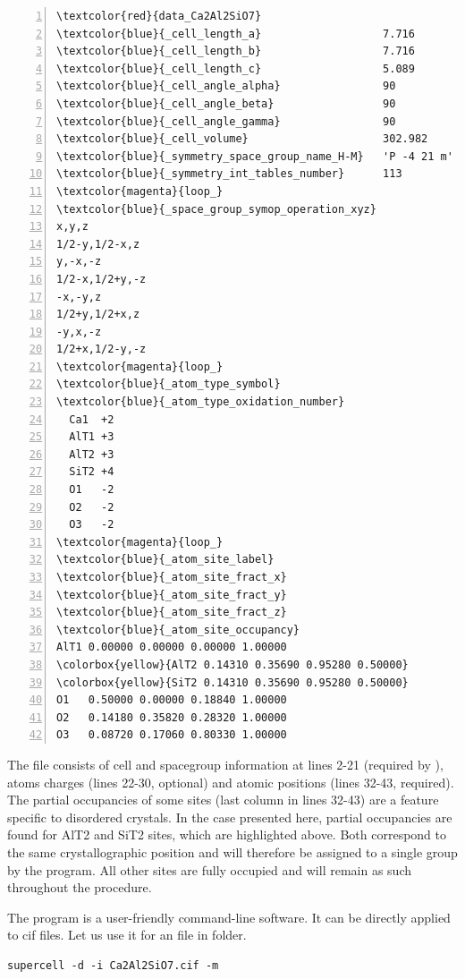 \documentclass[a4paper,10pt]{article}
\begin{document}
\begin{Verbatim}[commandchars=\\\{\}, numbers=left]
\textcolor{red}{data_Ca2Al2SiO7}
\textcolor{blue}{_cell_length_a}                   7.716
\textcolor{blue}{_cell_length_b}                   7.716
\textcolor{blue}{_cell_length_c}                   5.089
\textcolor{blue}{_cell_angle_alpha}                90
\textcolor{blue}{_cell_angle_beta}                 90
\textcolor{blue}{_cell_angle_gamma}                90
\textcolor{blue}{_cell_volume}                     302.982
\textcolor{blue}{_symmetry_space_group_name_H-M}   'P -4 21 m'
\textcolor{blue}{_symmetry_int_tables_number}      113
\textcolor{magenta}{loop_}
\textcolor{blue}{_space_group_symop_operation_xyz}
x,y,z
1/2-y,1/2-x,z
y,-x,-z
1/2-x,1/2+y,-z
-x,-y,z
1/2+y,1/2+x,z
-y,x,-z
1/2+x,1/2-y,-z
\textcolor{magenta}{loop_}
\textcolor{blue}{_atom_type_symbol}
\textcolor{blue}{_atom_type_oxidation_number}
  Ca1  +2
  AlT1 +3
  AlT2 +3
  SiT2 +4
  O1   -2
  O2   -2
  O3   -2
\textcolor{magenta}{loop_}
\textcolor{blue}{_atom_site_label}
\textcolor{blue}{_atom_site_fract_x}
\textcolor{blue}{_atom_site_fract_y}
\textcolor{blue}{_atom_site_fract_z}
\textcolor{blue}{_atom_site_occupancy}
AlT1 0.00000 0.00000 0.00000 1.00000
\colorbox{yellow}{AlT2 0.14310 0.35690 0.95280 0.50000}
\colorbox{yellow}{SiT2 0.14310 0.35690 0.95280 0.50000}
O1   0.50000 0.00000 0.18840 1.00000
O2   0.14180 0.35820 0.28320 1.00000
O3   0.08720 0.17060 0.80330 1.00000
\end{Verbatim}

The file consists of cell and spacegroup information at lines 2-21 (required by \sups{}), atoms charges (lines 22-30, optional) and atomic positions (lines 32-43, required). The partial occupancies of some sites (last column in lines 32-43) are a feature specific to disordered crystals. In the case presented here, partial occupancies are found for AlT2 and SiT2 sites, which are highlighted above. Both correspond to the same crystallographic position and will therefore be assigned to a single group by the \sups{} program. All other sites are fully occupied and will remain as such throughout the procedure.

The \sups{} program is a user-friendly command-line software. It can be directly applied to cif files. Let us use it for an  file in 
 folder.
\begin{Verbatim}[breaklines]
supercell -d -i Ca2Al2SiO7.cif -m
\end{Verbatim}
\end{document}
